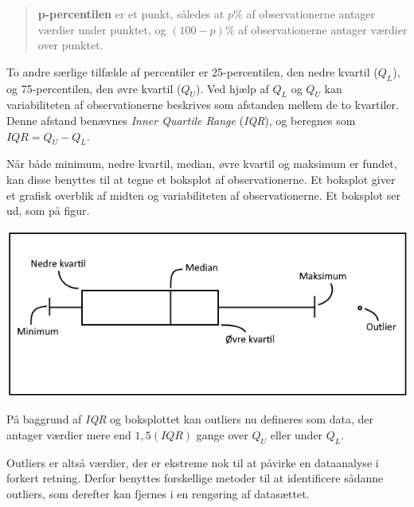 \documentclass[
]{book}
\theoremstyle{definition}
\theoremstyle{definition}
\theoremstyle{definition}
\theoremstyle{remark}
\let\BeginKnitrBlock\begin \let\EndKnitrBlock\end
\begin{document}
\begin{quote}
\BeginKnitrBlock{definition}
\protect\hypertarget{def:unnamed-chunk-3}{}{\label{def:unnamed-chunk-3} }\textbf{p-percentilen} er et punkt, således at \(p \%\) af observationerne antager værdier under punktet, og \((100 - p) \%\) af observationerne antager værdier over punktet.
\EndKnitrBlock{definition}
\end{quote}

To andre særlige tilfælde af percentiler er 25-percentilen, den nedre kvartil (\(Q_L\)), og 75-percentilen, den øvre kvartil (\(Q_U\)). Ved hjælp af \(Q_L\) og \(Q_U\) kan variabiliteten af observationerne beskrives som afstanden mellem de to kvartiler. Denne afstand benævnes \emph{Inner Quartile Range} (\emph{IQR}), og beregnes som \(IQR = Q_U - Q_L\).

Når både minimum, nedre kvartil, median, øvre kvartil og maksimum er fundet, kan disse benyttes til at tegne et boksplot af observationerne. Et boksplot giver et grafisk overblik af midten og variabiliteten af observationerne. Et boksplot ser ud, som på figur.

\begin{center}\includegraphics[width=0.75\linewidth]{images/Boksplot} \end{center}

På baggrund af \emph{IQR} og boksplottet kan outliers nu defineres som data, der antager værdier mere end \(1,5(IQR)\) gange over \(Q_U\) eller under \(Q_L\).

Outliers er altså værdier, der er ekstreme nok til at påvirke en dataanalyse i forkert retning. Derfor benyttes forskellige metoder til at identificere sådanne outliers, som derefter kan fjernes i en rengøring af datasættet.

  
\end{document}
